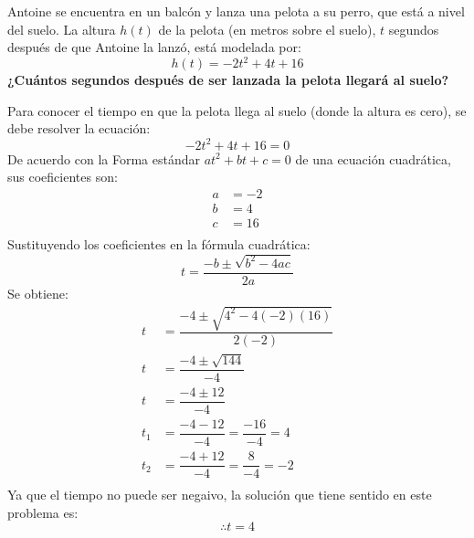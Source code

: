 Antoine se encuentra en un balcón y lanza una pelota a su perro, que está a nivel del suelo.
La altura $h(t)$ de la pelota (en metros sobre el suelo), $t$ segundos después de que Antoine la lanzó, está modelada por:
\[h(t)=-2t^2+4t+16\]
\textbf{¿Cuántos segundos después de ser lanzada la pelota llegará al suelo?}

\begin{solutionbox}{18cm}
    Para conocer el tiempo en que la pelota llega al suelo (donde la altura es cero), se debe resolver la ecuación:
    \[
        -2t^2+4t+16  =0
    \]
    De acuerdo con la Forma estándar $at^2 + bt + c = 0$ de una ecuación cuadrática, sus coeficientes son:
    \begin{align*}
        a & =-2 \\
        b & =4  \\
        c & =16 \\
    \end{align*}
    Sustituyendo los coeficientes en la fórmula cuadrática:
    \[t  = \dfrac{-b\pm\sqrt{b^2-4ac}}{2a} \]
    Se obtiene:
    \begin{align*}
        t   & = \dfrac{-4\pm\sqrt{4^2-4(-2)(16)}}{2(-2)} \\[1.5em]
        t   & = \dfrac{-4\pm\sqrt{144}}{-4}              \\[1.5em]
        t   & = \dfrac{-4\pm 12}{-4}                     \\[1.5em]
        t_1 & = \dfrac{-4-12}{-4}=\dfrac{-16}{-4}=4      \\[1.5em]
        t_2 & = \dfrac{-4+12}{-4}=\dfrac{8}{-4}=-2       \\[1.5em]
    \end{align*}
    Ya que el tiempo no puede ser negaivo, la solución que tiene sentido en este problema es:
    \[\therefore t=4\]
\end{solutionbox}
